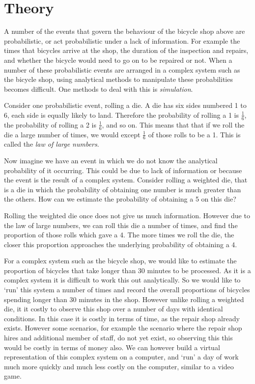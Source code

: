 \section{Theory}\label{sec:theory}

A number of the events that govern the behaviour of the bicycle shop above are
probabilistic, or act probabilistic under a lack of information. For example the
times that bicycles arrive at the shop, the duration of the inspection and
repairs, and whether the bicycle would need to go on to be repaired or not.
When a number of these probabilistic events are arranged in a complex system
such as the bicycle shop, using analytical methods to manipulate these
probabilities becomes difficult. One methods to deal with this is
\textit{simulation}.

Consider one probabilistic event, rolling a die.
A die has six sides numbered 1 to 6, each side is equally likely to land.
Therefore the probability of rolling a 1 is $\frac{1}{6}$, the probability of
rolling a 2 is $\frac{1}{6}$, and so on. This means that that if we roll the die
a large number of times, we would except $\frac{1}{6}$ of those rolls to be a 1.
This is called the \textit{law of large numbers}.

Now imagine we have an event in which we do not know the analytical probability
of it occurring. This could be due to lack of information or because the event
is the result of a complex system. Consider rolling a weighted die, that is a
die in which the probability of obtaining one number is much greater than the
others. How can we estimate the probability of obtaining a 5 on this die?

Rolling the weighted die once does not give us much information.
However due to the law of large numbers, we can roll this die a number of times,
and find the proportion of those rolls which gave a 4. The more times we roll
the die, the closer this proportion approaches the underlying probability of
obtaining a 4.

For a complex system such as the bicycle shop, we would like to estimate the
proportion of bicycles that take longer than 30 minutes to be processed. As it
is a complex system it is difficult to work this out analytically. So we would
like to `run' this system a number of times and record the overall proportions
of bicycles spending longer than 30 minutes in the shop.
However unlike rolling a weighted die, it it costly to observe this shop over a
number of days with identical conditions. In this case it is costly in terms of
time, as the repair shop already exists. However some scenarios, for example the
scenario where the repair shop hires and additional member of staff, do not yet
exist, so observing this this would be costly in terms of money also.
We can however build a virtual representation of this complex system on a
computer, and `run' a day of work much more quickly and much less costly on the
computer, similar to a video game.

